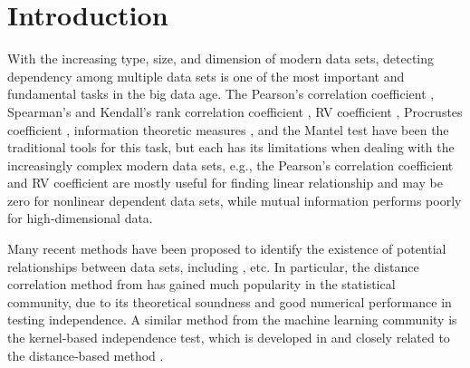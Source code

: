 \documentclass[11pt]{article}
\begin{document}
\clearpage
\tableofcontents


\newpage
{}

\section{Introduction}
\label{sec:intro}
With the increasing type, size, and dimension of modern data sets, detecting dependency among multiple data sets is one of the most important and fundamental tasks in the big data age. The Pearson's correlation coefficient \cite{Pearson1895}, Spearman's and Kendall's rank correlation coefficient \cite{KendallBook}, RV coefficient \cite{RobertEscoufier1976}, Procrustes coefficient \cite{GowerProcrustesBook}, information theoretic measures \cite{Renyi1959}, and the Mantel test \cite{Mantel1967} have been the traditional tools for this task, but each has its limitations when dealing with the increasingly complex modern data sets, e.g., the Pearson's correlation coefficient and RV coefficient are mostly useful for finding linear relationship and may be zero for nonlinear dependent data sets, while mutual information performs poorly for high-dimensional data. 

Many recent methods have been proposed to identify the existence of potential relationships between data sets, including \cite{Baringhaus2004,TaskinenOjaRandles2005, GrettonEtAl2005, SzekelyRizzoBakirov2007, GrettonGyorfi2010,Reshef2011, HellerGorfine2013, Reimherr2013, SzekelyRizzo2013a, SzekelyRizzo2013b, RizzoSzekely2016}, etc. In particular, the distance correlation method from \cite{SzekelyRizzoBakirov2007, SzekelyRizzo2009, SzekelyRizzo2013a, SzekelyRizzo2014} has gained much popularity in the statistical community, due to its theoretical soundness and good numerical performance in testing independence. A similar method from the machine learning community is the kernel-based independence test, which is developed in \cite{GrettonEtAl2005, GrettonGyorfi2010, GrettonEtAl2012} and closely related to the distance-based method \cite{SejdinovicEtAl2013, RamdasEtAl2015}.
\end{document}
